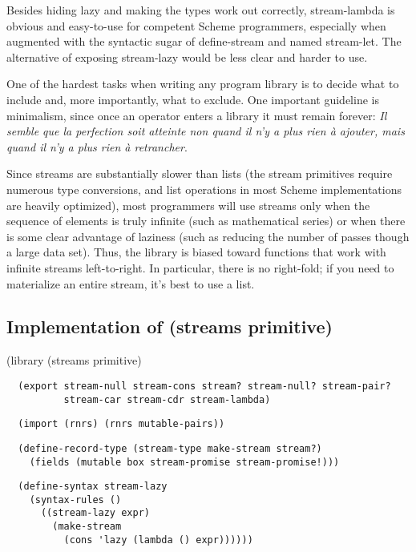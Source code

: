Besides hiding lazy and making the types work out correctly,
stream-lambda is obvious and easy-to-use for competent Scheme
programmers, especially when augmented with the syntactic sugar of
define-stream and named stream-let. The alternative of exposing
stream-lazy would be less clear and harder to use.

One of the hardest tasks when writing any program library is to decide
what to include and, more importantly, what to exclude. One important
guideline is minimalism, since once an operator enters a library it must
remain forever: \emph{Il semble que la perfection soit atteinte non
quand il n'y a plus rien à ajouter, mais quand il n'y a plus rien à
retrancher}.

Since streams are substantially slower than lists (the stream primitives
require numerous type conversions, and list operations in most Scheme
implementations are heavily optimized), most programmers will use
streams only when the sequence of elements is truly infinite (such as
mathematical series) or when there is some clear advantage of laziness
(such as reducing the number of passes though a large data set). Thus,
the library is biased toward functions that work with infinite streams
left-to-right. In particular, there is no right-fold; if you need to
materialize an entire stream, it's best to use a list.

\subsection{Implementation of (streams
primitive)}\label{implementation-of-streams-primitive}

(library (streams primitive)

\begin{verbatim}
  (export stream-null stream-cons stream? stream-null? stream-pair?
          stream-car stream-cdr stream-lambda)
\end{verbatim}

\begin{verbatim}
  (import (rnrs) (rnrs mutable-pairs))
\end{verbatim}

\begin{verbatim}
  (define-record-type (stream-type make-stream stream?)
    (fields (mutable box stream-promise stream-promise!)))
\end{verbatim}

\begin{verbatim}
  (define-syntax stream-lazy
    (syntax-rules ()
      ((stream-lazy expr)
        (make-stream
          (cons 'lazy (lambda () expr))))))
\end{verbatim}

